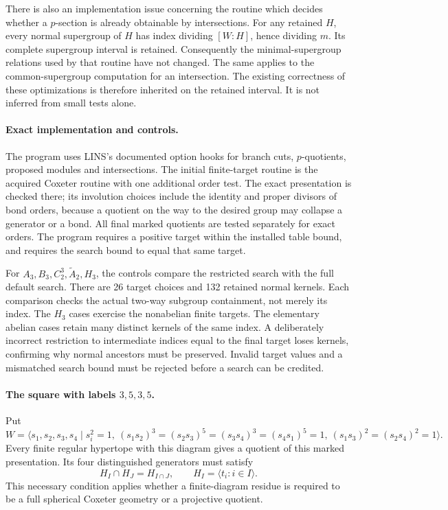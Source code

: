 \documentclass[11pt]{article}
\begin{document}
There is also an implementation issue concerning the routine which
decides whether a $p$-section is already obtainable by intersections.
For any retained $H$, every normal supergroup of $H$ has index dividing
$[W:H]$, hence dividing $m$. Its complete supergroup interval is retained.
Consequently the minimal-supergroup relations used by that routine have
not changed. The same applies to the common-supergroup computation for
an intersection. The existing correctness of these optimizations is
therefore inherited on the retained interval. It is not inferred from
small tests alone.

\newpage
\paragraph{Exact implementation and controls.}
The program uses LINS's documented option hooks for branch cuts,
$p$-quotients, proposed modules and intersections. The initial finite-target
routine is the acquired Coxeter routine with one additional order test.
The exact presentation is checked there; its involution choices include
the identity and proper divisors of bond orders, because a quotient on
the way to the desired group may collapse a generator or a bond.
All final marked quotients are tested separately for exact orders.
The program requires a positive target within the installed table bound,
and requires the search bound to equal that same target.

For $A_3,B_3,C_2^3,\widetilde A_2,H_3$, the controls compare the restricted
search with the full default search. There are 26 target choices and
132 retained normal kernels. Each comparison checks the actual two-way
subgroup containment, not merely its index. The $H_3$ cases exercise the
nonabelian finite targets. The elementary abelian cases retain many
distinct kernels of the same index. A deliberately incorrect restriction
to intermediate indices equal to the final target loses kernels, confirming
why normal ancestors must be preserved. Invalid target values and a
mismatched search bound must be rejected before a search can be credited.

\paragraph{The square with labels $3,5,3,5$.}
Put
\[
 W=\langle s_1,s_2,s_3,s_4\mid s_i^2=1,\
 (s_1s_2)^3=(s_2s_3)^5=(s_3s_4)^3=(s_4s_1)^5=1,\
 (s_1s_3)^2=(s_2s_4)^2=1\rangle.
\]
Every finite regular hypertope with this diagram gives a quotient of
this marked presentation. Its four distinguished generators must satisfy
\[
 H_I\cap H_J=H_{I\cap J},\qquad
 H_I=\langle t_i:i\in I\rangle.
\]
This necessary condition applies whether a finite-diagram residue is
required to be a full spherical Coxeter geometry or a projective quotient.
\end{document}
